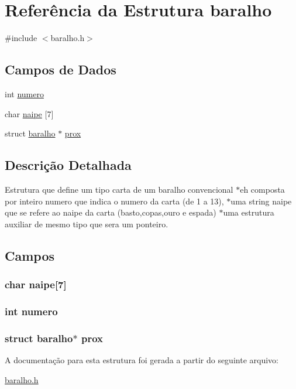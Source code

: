 \hypertarget{structbaralho}{\section{Referência da Estrutura baralho}
\label{structbaralho}
}


{\ttfamily \#include $<$baralho.\-h$>$}

\subsection*{Campos de Dados}
\begin{DoxyCompactItemize}
\item 
int \hyperlink{structbaralho_a2c30f43104974e72e2809fb4569804b0}{numero}
\item 
char \hyperlink{structbaralho_a135847880893ea2bd8c4932de9b9a3d1}{naipe} \mbox{[}7\mbox{]}
\item 
struct \hyperlink{structbaralho}{baralho} $\ast$ \hyperlink{structbaralho_a19c73fab82a96a8997535a021dcb09ae}{prox}
\end{DoxyCompactItemize}


\subsection{Descrição Detalhada}
Estrutura que define um tipo carta de um baralho convencional $\ast$eh composta por inteiro numero que indica o numero da carta (de 1 a 13), $\ast$uma string naipe que se refere ao naipe da carta (basto,copas,ouro e espada) $\ast$uma estrutura auxiliar de mesmo tipo que sera um ponteiro. 

\subsection{Campos}
\hypertarget{structbaralho_a135847880893ea2bd8c4932de9b9a3d1}{
\subsubsection[{naipe}]{\setlength{\rightskip}{0pt plus 5cm}char {\bf naipe}\mbox{[}7\mbox{]}}}\label{structbaralho_a135847880893ea2bd8c4932de9b9a3d1}
\hypertarget{structbaralho_a2c30f43104974e72e2809fb4569804b0}{
\subsubsection[{numero}]{\setlength{\rightskip}{0pt plus 5cm}int {\bf numero}}}\label{structbaralho_a2c30f43104974e72e2809fb4569804b0}
\hypertarget{structbaralho_a19c73fab82a96a8997535a021dcb09ae}{
\subsubsection[{prox}]{\setlength{\rightskip}{0pt plus 5cm}struct {\bf baralho}$\ast$ {\bf prox}}}\label{structbaralho_a19c73fab82a96a8997535a021dcb09ae}


A documentação para esta estrutura foi gerada a partir do seguinte arquivo\-:\begin{DoxyCompactItemize}
\item 
\hyperlink{baralho_8h}{baralho.\-h}\end{DoxyCompactItemize}
